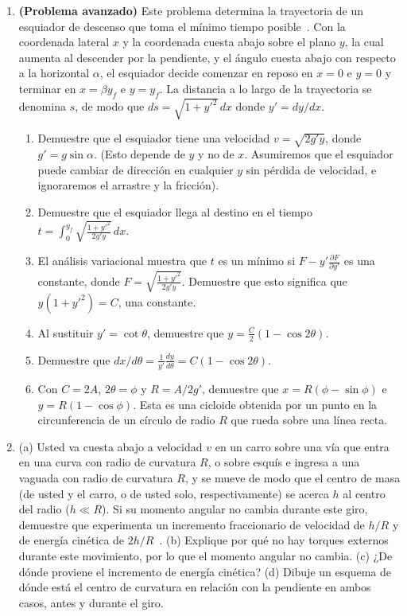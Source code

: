 \documentclass[12pt]{book}
\begin{document}
\begin{enumerate}
\item[3.69] \textbf{(Problema avanzado)} Este problema determina la trayectoria de un esquiador de descenso que toma el mínimo tiempo posible~\cite{ref88}. Con la coordenada lateral $x$ y la coordenada cuesta abajo sobre el plano $y$, la cual aumenta al descender por la pendiente, y el ángulo cuesta abajo con respecto a la horizontal $\alpha$, el esquiador decide comenzar en reposo en $x = 0$ e $y = 0$ y terminar en $x = \beta y_f$ e $y = y_f$. La distancia a lo largo de la trayectoria se denomina $s$, de modo que $ds = \sqrt{1 + y'^2}\,dx$ donde $y' = dy/dx$.
\begin{enumerate}
\item[(a)] Demuestre que el esquiador tiene una velocidad $v = \sqrt{2 g' y}$, donde $g' = g \sin \alpha$. (Esto depende de $y$ y no de $x$. Asumiremos que el esquiador puede cambiar de dirección en cualquier $y$ sin pérdida de velocidad, e ignoraremos el arrastre y la fricción).
\item[(b)] Demuestre que el esquiador llega al destino en el tiempo $t = \int_0^{y_f} \sqrt{\frac{1 + y'^2}{2 g' y}}\,dx$.
\item[(c)] El análisis variacional muestra que $t$ es un mínimo si $F - y' \frac{\partial F}{\partial y'}$ es una constante, donde $F = \sqrt{\frac{1 + y'^2}{2 g' y}}$. Demuestre que esto significa que $y(1 + y'^2) = C$, una constante.
\item[(d)] Al sustituir $y' = \cot \theta$, demuestre que $y = \frac{C}{2}(1 - \cos 2\theta)$.
\item[(e)] Demuestre que $dx/d\theta = \frac{1}{y'} \frac{dy}{d\theta} = C(1 - \cos 2\theta)$.
\item[(f)] Con $C = 2A$, $2\theta = \phi$ y $R = A/2g'$, demuestre que $x = R(\phi - \sin \phi)$ e $y = R(1 - \cos \phi)$. Esta es una cicloide obtenida por un punto en la circunferencia de un círculo de radio $R$ que rueda sobre una línea recta.
\end{enumerate}

\item[3.70] (a) Usted va cuesta abajo a velocidad $v$ en un carro sobre una vía que entra en una curva con radio de curvatura $R$, o sobre esquís e ingresa a una vaguada con radio de curvatura $R$, y se mueve de modo que el centro de masa (de usted y el carro, o de usted solo, respectivamente) se acerca $h$ al centro del radio ($h \ll R$). Si su momento angular no cambia durante este giro, demuestre que experimenta un incremento fraccionario de velocidad de $h/R$ y de energía cinética de $2h/R$~\cite{ref88,ref104}.
(b) Explique por qué no hay torques externos durante este movimiento, por lo que el momento angular no cambia.
(c) ¿De dónde proviene el incremento de energía cinética?
(d) Dibuje un esquema de dónde está el centro de curvatura en relación con la pendiente en ambos casos, antes y durante el giro.


\end{enumerate}
\end{document}

